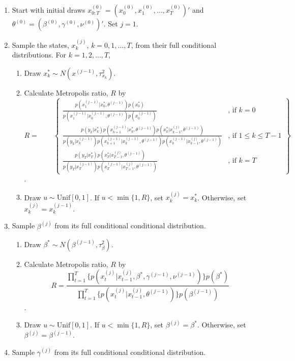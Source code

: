 \documentclass{article}
\begin{document}
\begin{enumerate}
\item Start with initial draws $x^{(0)}_{0:T} = (x^{(0)}_0, x^{(0)}_1, \ldots, x^{(0)}_T)'$ and $\theta^{(0)} = (\beta^{(0)}, \gamma^{(0)}, \nu^{(0)})'$. Set $j = 1$.
\item \label{step:gibbs} Sample the states, $x^{(j)}_k$, $k = 0,1,\ldots,T$, from their full conditional distributions. For $k = 1, 2, \ldots, T$,
    \begin{enumerate}[label=\alph*.,leftmargin=1.75\parindent]
    \item Draw $x^*_k \sim N(x^{(j-1)},\tau^2_{x_k})$.
    \item Calculate Metropolis ratio, $R$ by
    \[R = \qquad \left\{
    \begin{array}{cc}
    \frac{p(x^{(j-1)}_1|x^*_0,\theta^{(j-1)})p(x^*_0)}{p(x^{(j-1)}_1|x^{(j-1)}_0,\theta^{(j-1)})p(x^{(j-1)}_0)} & \mbox{, if } k = 0 \\
    \frac{p(y_k|x^*_k)p(x^{(j-1)}_{k+1}|x^*_k,\theta^{(j-1)})p(x^*_k|x^{(j)}_{k-1},\theta^{(j-1)})}{p(y_k|x^{(j-1)}_k)p(x^{(j-1)}_{k+1}|x^{(j-1)}_k,\theta^{(j-1)})p(x^{(j-1)}_k|x^{(j)}_{k-1},\theta^{(j-1)})} & \mbox{, if } 1 \le k \le T-1 \\
        \frac{p(y_T|x^*_T)p(x^*_T|x^{(j)}_{T-1},\theta^{(j-1)})}{p(y_T|x^{(j-1)}_T)p(x^{(j-1)}_T|x^{(j)}_{T-1},\theta^{(j-1)})}  & \mbox{, if } k = T
    \end{array}
    \right\}\].
    \item Draw $u \sim \mbox{Unif}[0,1]$. If $u < \min\{1, R\}$, set $x^{(j)}_k = x^*_k$. Otherwise, set $x^{(j)}_k = x^{(j-1)}_k$.
    \end{enumerate}
\item Sample $\beta^{(j)}$ from its full conditional conditional distribution.
    \begin{enumerate}[label=\alph*.,leftmargin=1.75\parindent]
    \item Draw $\beta^* \sim N(\beta^{(j-1)},\tau^2_{\beta})$.
    \item Calculate Metropolis ratio, $R$ by
    \[R = \frac{\prod_{t=1}^T \{p(x^{(j)}_t|x^{(j)}_{t-1},\beta^*,\gamma^{(j-1)},\nu^{(j-1)})\}p(\beta^*)}{\prod_{t=1}^T \{p(x^{(j)}_t|x^{(j)}_{t-1},\theta^{(j-1)})\}p(\beta^{(j-1)})}\].
    \item Draw $u \sim \mbox{Unif}[0,1]$. If $u < \min\{1, R\}$, set $\beta^{(j)} = \beta^*$. Otherwise, set $\beta^{(j)} = \beta^{(j-1)}$.
    \end{enumerate}
\item Sample $\gamma^{(j)}$ from its full conditional conditional distribution.

\end{enumerate}
\end{document}
